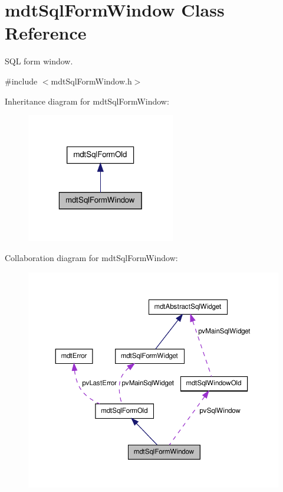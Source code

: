 \hypertarget{classmdt_sql_form_window}{
\section{mdtSqlFormWindow Class Reference}
\label{classmdt_sql_form_window}
}


SQL form window.  




{\ttfamily \#include $<$mdtSqlFormWindow.h$>$}



Inheritance diagram for mdtSqlFormWindow:\nopagebreak
\begin{figure}[H]
\begin{center}
\leavevmode
\includegraphics[width=184pt]{classmdt_sql_form_window__inherit__graph}
\end{center}
\end{figure}


Collaboration diagram for mdtSqlFormWindow:
\nopagebreak
\begin{figure}[H]
\begin{center}
\leavevmode
\includegraphics[width=366pt]{classmdt_sql_form_window__coll__graph}
\end{center}
\end{figure}
